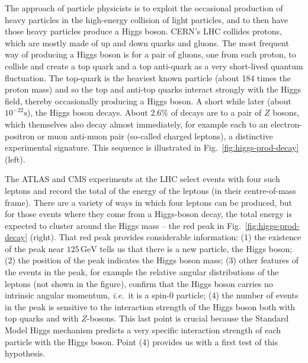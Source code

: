 \documentclass[12pt]{article}
\newcommand{\GeV}{\,\text{GeV}}
\begin{document}
The approach of particle physicists is to exploit the occasional production of heavy particles in the high-energy collision of light particles, and to then have 
those heavy particles produce a Higgs boson.
%
CERN's LHC collides protons, which are mostly made of up and down
quarks and gluons.
%
The most frequent way of producing a Higgs boson
%
is for a pair of gluons, one from each proton, to collide and
create a top quark and a top anti-quark as a very short-lived quantum
fluctuation.
%
The top-quark is the heaviest known particle (about 184 times the
proton mass) and so the top and anti-top quarks interact
strongly with the Higgs field, thereby occasionally producing a Higgs
boson.
%
A short while later (about $10^{-22}\text{s}$), the Higgs boson decays.
%
About $2.6\%$ of decays are to a pair of $Z$ bosons, which themselves
also decay almost immediately, for example each to an
electron-positron or muon anti-muon pair (so-called charged leptons),
a distinctive experimental signature.
%
This sequence is illustrated in Fig.~\ref{fig:higgs-prod-decay} (left).

The ATLAS and CMS experiments at the LHC select events with four such
leptons and record the total of the energy of the leptons (in their
centre-of-mass frame).
%
There are a variety of ways in which four leptons can be produced, but
for those events where they come from a Higgs-boson decay, the total
energy is expected to cluster around the Higgs mass --  
the red peak in Fig.~\ref{fig:higgs-prod-decay} (right).
%
That red peak provides considerable information:
%
(1) the existence of the peak near $125\GeV$ tells us that there is a
new particle, the Higgs boson;
%
(2) the position of the peak indicates the Higgs boson mass;
%
%
(3) other features of the events in the peak, for example the relative
angular distributions of the leptons (not shown in the figure),
confirm that the Higgs boson carries no intrinsic angular momentum,
{\it i.e.}\ it is a spin-0 particle;
%
(4) the number of events in the peak is sensitive to the interaction
strength of the Higgs boson both with top quarks and with $Z$-bosons.
%
This last point is crucial
%
because the Standard Model Higgs mechanism
predicts a very specific
interaction strength of each particle with the Higgs boson.
Point (4) provides us with a first test of this hypothesis.
\end{document}
